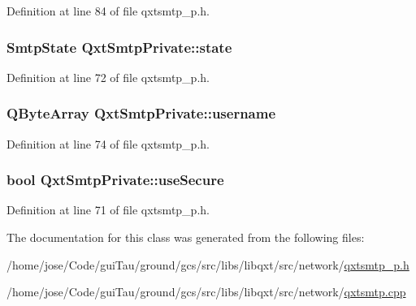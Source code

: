 Definition at line 84 of file qxtsmtp\-\_\-p.\-h.

\hypertarget{class_qxt_smtp_private_a85f43730b65a043e30cb6f1304abe898}{
\subsubsection[{state}]{\setlength{\rightskip}{0pt plus 5cm}Smtp\-State Qxt\-Smtp\-Private\-::state}}\label{class_qxt_smtp_private_a85f43730b65a043e30cb6f1304abe898}


Definition at line 72 of file qxtsmtp\-\_\-p.\-h.

\hypertarget{class_qxt_smtp_private_acdf3312139d468db12f6e899529a3c70}{
\subsubsection[{username}]{\setlength{\rightskip}{0pt plus 5cm}Q\-Byte\-Array Qxt\-Smtp\-Private\-::username}}\label{class_qxt_smtp_private_acdf3312139d468db12f6e899529a3c70}


Definition at line 74 of file qxtsmtp\-\_\-p.\-h.

\hypertarget{class_qxt_smtp_private_a90281928af777a73ba329b3c7ebd5a7d}{
\subsubsection[{use\-Secure}]{\setlength{\rightskip}{0pt plus 5cm}bool Qxt\-Smtp\-Private\-::use\-Secure}}\label{class_qxt_smtp_private_a90281928af777a73ba329b3c7ebd5a7d}


Definition at line 71 of file qxtsmtp\-\_\-p.\-h.



The documentation for this class was generated from the following files\-:\begin{DoxyCompactItemize}
\item 
/home/jose/\-Code/gui\-Tau/ground/gcs/src/libs/libqxt/src/network/\hyperlink{qxtsmtp__p_8h}{qxtsmtp\-\_\-p.\-h}\item 
/home/jose/\-Code/gui\-Tau/ground/gcs/src/libs/libqxt/src/network/\hyperlink{qxtsmtp_8cpp}{qxtsmtp.\-cpp}\end{DoxyCompactItemize}
